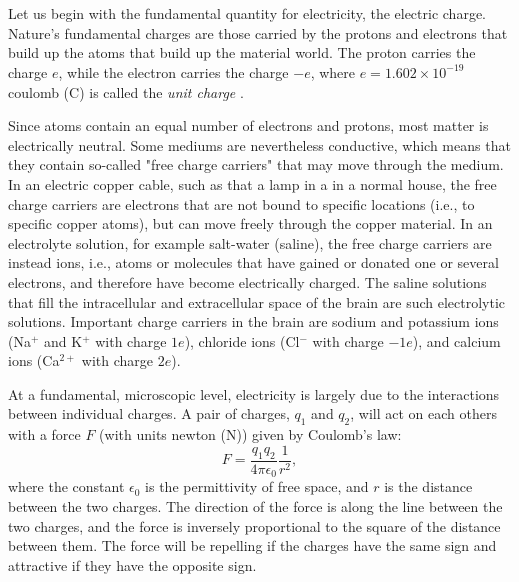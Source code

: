 \section{}
\label{sec:Basics:Charge} 
Let us begin with the fundamental quantity for electricity, the electric charge. Nature's fundamental charges are those carried by the protons and electrons that build up the atoms that build up the material world. The proton carries the charge $e$, while the electron carries the charge $-e$, where $e = 1.602\times10^{-19}$ coulomb (\si{\coulomb}) is called the \textit{unit charge} . 

Since atoms  contain an equal number of electrons and protons, most matter is electrically neutral. Some mediums are nevertheless conductive, which means that they contain so-called "free charge carriers" that may move through the medium. In an electric copper cable, such as that  a lamp in a in a normal house, the free charge carriers are electrons that are not bound to specific locations (i.e., to specific copper atoms), but can move freely through the copper material. In an electrolyte solution, for example salt-water (saline), the free charge carriers are instead ions, i.e., atoms or molecules that have gained or donated one or several electrons, and therefore have become electrically charged. The saline solutions that fill the intracellular and extracellular space of the brain are such electrolytic solutions. Important charge carriers in the brain are sodium and potassium ions (Na$^+$ and K$^+$ with charge $1e$), chloride ions (Cl$^-$ with charge $-1e$), and calcium ions (Ca$^{2+}$ with charge $2e$).

At a fundamental, microscopic level, electricity is largely due to the interactions between individual charges. A pair of charges, $q_1$ and $q_2$, will act on each others with a force $F$ (with units newton (\si{\newton})) given by Coulomb's law:
\begin{equation}
F = \frac{q_1q_2}{4\pi \epsilon_0} \frac{1}{r^2}, 
\label{eq:Basics:CoulombF}
\end{equation}
where the constant $\epsilon_0$ is the permittivity of free space, and $r$ is the distance between the two charges. The direction of the force is along the line between the two charges, and the force is inversely proportional to the square of the distance between them. The force will be repelling if the charges have the same sign and attractive if they have the opposite sign.

